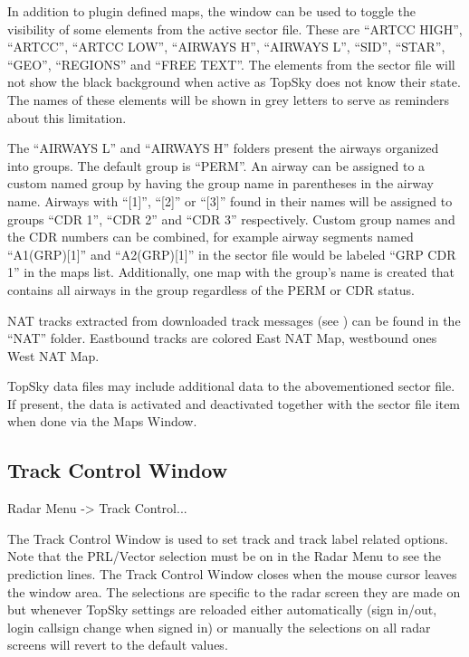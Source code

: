 \documentclass[11pt,a4paper,oldfontcommands]{memoir}
\begin{document}
In addition to plugin defined maps, the window can be used to toggle the visibility of some elements from the active sector file. These are “ARTCC HIGH”, “ARTCC”, “ARTCC LOW”, “AIRWAYS H”, “AIRWAYS L”, “SID”, “STAR”, “GEO”, “REGIONS” and “FREE TEXT”. The elements from the sector file will not show the black background when active as TopSky does not know their state. The names of these elements will be shown in grey letters to serve as reminders about this limitation.

The “AIRWAYS L” and “AIRWAYS H” folders present the airways organized into groups. The default group is “PERM”. An airway can be assigned to a custom named group by having the group name in parentheses in the airway name. Airways with “[1]”, “[2]” or “[3]” found in their names will be assigned to groups “CDR 1”, “CDR 2” and “CDR 3” respectively. Custom group names and the CDR numbers can be combined, for example airway segments named “A1(GRP)[1]” and “A2(GRP)[1]” in the sector file would be labeled “GRP CDR 1” in the maps list. Additionally, one map with the group’s name is created that contains all airways in the group regardless of the PERM or CDR status.

NAT tracks extracted from downloaded track messages (see \textit{}) can be found in the “NAT” folder. Eastbound tracks are colored East NAT Map, westbound ones West NAT Map.

TopSky data files may include additional data to the abovementioned sector file. If present, the data is activated and deactivated together with the sector file item when done via the Maps Window.

\subsection{Track Control Window}
\label{win:tcw}

Radar Menu -> Track Control...

The Track Control Window is used to set track and track label related options. Note that the PRL/Vector selection must be on in the Radar Menu to see the prediction lines. The Track Control Window closes when the mouse cursor leaves the window area. The selections are specific to the radar screen they are made on but whenever TopSky settings are reloaded either automatically (sign in/out, login callsign change when signed in) or manually the selections on all radar screens will revert to the default values.
\end{document}
